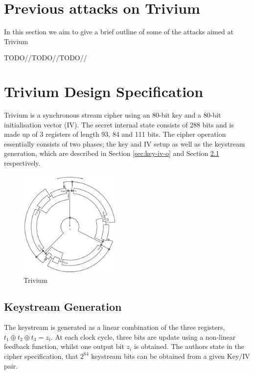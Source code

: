 \documentclass[conference]{IEEEtran}
\begin{document}
\section{Previous attacks on Trivium}

In this section we aim to give a brief outline of some of the attacks aimed at Trivium 

TODO//TODO//TODO//





\section{Trivium Design Specification}

Trivium is a synchronous stream cipher using an 80-bit key and a 80-bit initialisation vector (IV). The secret internal state consists of 288 bits and is made up of 3 registers of length 93, 84 and 111 bits. The cipher operation essentially consists of two phases; the key and IV setup as well as the keystream generation, which are described in Section \ref{sec:key-iv-o} and Section \ref{sec:key-gen-o} respectively.

\begin{figure}[H]
\centering
\includegraphics[width=0.45\textwidth]{figures/round.png}
\caption{Trivium \cite{circle}}
\label{fig:circle}
\end{figure}

\subsection{Keystream Generation}\label{sec:key-gen-o}
The keystream is generated as a linear combination of the three registers, $t_1\oplus t_2\oplus t_3=z_i$. At each clock cycle, three bits are update using a non-linear feedback function, whilst one output bit $z_i$ is obtained. The authors state in the cipher specification, that $2^{64}$ keystream bits can be obtained from a given Key/IV pair.
\end{document}
